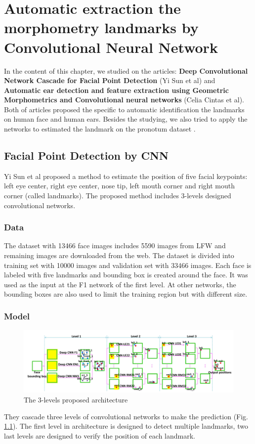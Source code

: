 \chapter{Automatic extraction the morphometry landmarks by Convolutional Neural Network}
In the content of this chapter, we studied on the articles: \textbf{Deep Convolutional Network Cascade for Facial Point Detection}\cite{sun2013deep} (Yi Sun et al) and \textbf{Automatic ear detection and feature extraction using Geometric Morphometrics and Convolutional neural networks}\cite{cintas2016automatic} (Celia Cintas et al). Both of articles proposed the specific to automatic identification the landmarks on human face and human ears. Besides the studying, we also tried to apply the networks to estimated the landmark on the pronotum dataset \cite{}.
\section{Facial Point Detection by CNN}
Yi Sun et al proposed a method to estimate the position of five facial keypoints: left eye center, right eye center, nose tip, left mouth corner and right mouth corner (called landmarks). The proposed method includes 3-levels designed convolutional networks.
\subsection{Data}
The dataset with 13466 face images includes 5590 images from LFW \cite{huang2007labeled} and remaining images are downloaded from the web. The dataset is divided into training set with 10000 images and validation set with 33466 images. Each face is labeled with five landmarks and bounding box is created around the face. It was used as the input at the F1 network of the first level. At other networks, the bounding boxes are also used to limit the training region but with different size.
\subsection{Model}
\begin{figure}[h]
	\centering
	\includegraphics[scale=0.3]{images/3levels}
	\caption{The 3-levels proposed architecture}
	\label{3levels}
\end{figure}
They cascade three levels of convolutional networks to make the prediction (Fig. \ref{3levels}). The first level in architecture is designed to detect multiple landmarks, two last levels are designed to verify the position of each landmark.

